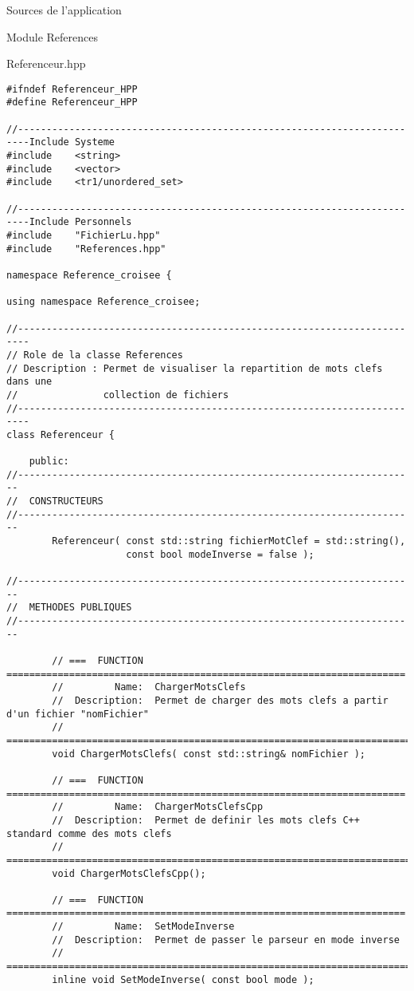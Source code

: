\documentclass{article}
\begin{document}
\begin{section}{Sources de l'application}
\begin{subsection}{Module References}
\begin{paragraph}{Referenceur.hpp}
\begin{verbatim}
#ifndef Referenceur_HPP
#define Referenceur_HPP

//------------------------------------------------------------------------Include Systeme
#include    <string>
#include    <vector>
#include    <tr1/unordered_set>

//------------------------------------------------------------------------Include Personnels
#include    "FichierLu.hpp"
#include    "References.hpp"

namespace Reference_croisee {

using namespace Reference_croisee;

//------------------------------------------------------------------------
// Role de la classe References
// Description : Permet de visualiser la repartition de mots clefs dans une
//               collection de fichiers
//------------------------------------------------------------------------
class Referenceur {

    public:
//----------------------------------------------------------------------
//  CONSTRUCTEURS
//----------------------------------------------------------------------
        Referenceur( const std::string fichierMotClef = std::string(),
                     const bool modeInverse = false );

//----------------------------------------------------------------------
//  METHODES PUBLIQUES
//----------------------------------------------------------------------

        // ===  FUNCTION  ======================================================================
        //         Name:  ChargerMotsClefs
        //  Description:  Permet de charger des mots clefs a partir d'un fichier "nomFichier" 
        // =====================================================================================
        void ChargerMotsClefs( const std::string& nomFichier );
        
        // ===  FUNCTION  ======================================================================
        //         Name:  ChargerMotsClefsCpp
        //  Description:  Permet de definir les mots clefs C++ standard comme des mots clefs
        // =====================================================================================
        void ChargerMotsClefsCpp();
        
        // ===  FUNCTION  ======================================================================
        //         Name:  SetModeInverse
        //  Description:  Permet de passer le parseur en mode inverse
        // =====================================================================================
        inline void SetModeInverse( const bool mode );


\end{verbatim}
\end{paragraph}
\end{subsection}
\end{section}
\end{document}
